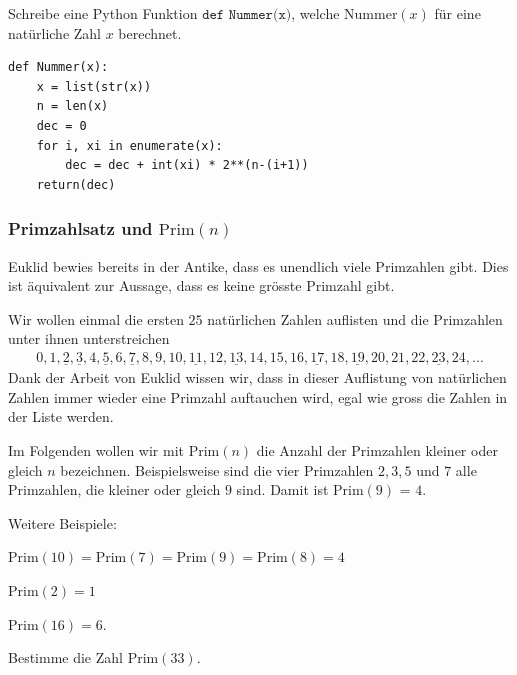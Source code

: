 \begin{Exercise}

Schreibe eine Python Funktion $\texttt{def Nummer(x)}$, welche $\text{Nummer}(x)$ für eine natürliche Zahl $x$ berechnet.
\end{Exercise}

\begin{Answer}
\begin{verbatim}
def Nummer(x):
    x = list(str(x))
    n = len(x)
    dec = 0
    for i, xi in enumerate(x):
        dec = dec + int(xi) * 2**(n-(i+1))
    return(dec)
\end{verbatim}
\end{Answer}



\subsubsection{Primzahlsatz und $\text{Prim}(n)$}
Euklid bewies bereits in der Antike, dass es unendlich viele Primzahlen gibt. Dies ist äquivalent zur Aussage, dass es keine grösste Primzahl gibt.

Wir wollen einmal die ersten $25$ natürlichen Zahlen auflisten und die Primzahlen unter ihnen unterstreichen
\begin{align*}
    0, 1, \underline{2}, \underline{3}, 4, \underline{5}, 6, \underline{7}, 8, 9, 10, \underline{11}, 12, \underline{13}, 14, 15, 16, \underline{17}, 18, \underline{19}, 20, 21, 22, \underline{23}, 24, ...
\end{align*}
Dank der Arbeit von Euklid wissen wir, dass in dieser Auflistung von natürlichen Zahlen immer wieder eine Primzahl auftauchen wird, egal wie gross die Zahlen in der Liste werden.

Im Folgenden wollen wir mit $\text{Prim}(n)$ die Anzahl der Primzahlen kleiner oder gleich $n$ bezeichnen. Beispielsweise sind die vier Primzahlen $2, 3, 5$ und $7$ alle Primzahlen, die kleiner oder gleich $9$ sind. Damit ist $\text{Prim}(9)$ = $4$.

Weitere Beispiele:

$\text{Prim}(10) = \text{Prim}(7) = \text{Prim}(9) = \text{Prim}(8) = 4$

$\text{Prim}(2) = 1$

$\text{Prim}(16) = 6$.


\begin{Exercise}
Bestimme die Zahl $\text{Prim}(33)$.
\end{Exercise}

